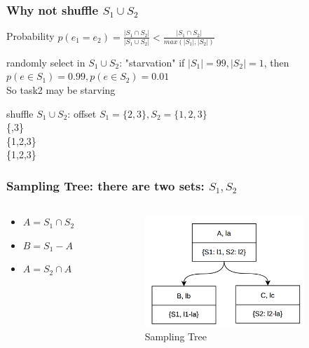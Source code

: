 \documentclass[notheorems, aspectratio=54]{beamer}
\begin{document}
\begin{frame}
    \frametitle{Why not shuffle $S_1 \cup S_2$}
    \begin{block} {Probability}
        $p(e_1=e_2) = \frac{|S_1\cap S_2|}{|S_1 \cup S_2|} < \frac{|S_1\cap S_2|}{max(|S_1|,|S_2|)}$
    \end{block}
    \begin{block} {randomly select in $S_1\cup S_2$: "starvation"}
        if $|S_1| = 99, |S_2| = 1$,
        then $p(e \in S_1) = 0.99, p(e \in S_2) = 0.01$ \\
        So task2 may be starving
    \end{block}
    \begin{block} {shuffle $S_1\cup S_2$: offset}
        $S_1 = \{2,3\}, S_2 = \{1,2,3\}$\\
        \{\space {},3\}\\
        \{1,2,3\} \\
        \{1,2,3\}\\
    \end{block}
\end{frame}


\begin{frame}
    \frametitle{Sampling Tree: there are two sets: $S_1, S_2$}
    \begin{columns}
        \begin{column}{0.48\textwidth}
            \begin{itemize}
                \item $A = S_1\cap S_2$
                \item $B = S_1- A$
                \item $A = S_2\cap A$
            \end{itemize}
        \end{column}
        \begin{column}{0.48\textwidth}
            \begin{figure}
                \centering
                \includegraphics[width=6cm]{global_img_dir/st1.png}
                \caption{Sampling Tree}
            \end{figure}
        \end{column}
    \end{columns}
\end{frame}
\end{document}
